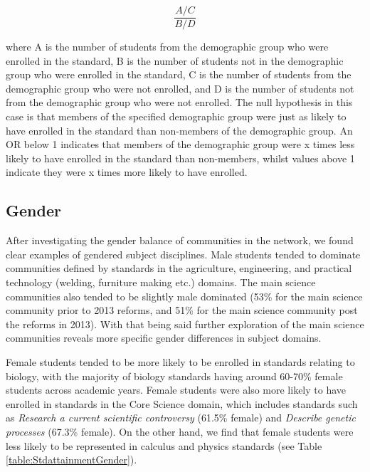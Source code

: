 \documentclass[a4paper]{article}
\begin{document}
    $$\frac{A/C}{B/D}$$

where A is the number of students from the demographic group who were enrolled in the standard, B is the number of students not in the demographic group who were enrolled in the standard, C is the number of students from the demographic group who were not enrolled, and D is the number of students not from the demographic group who were not enrolled. The null hypothesis in this case is that members of the specified demographic group were just as likely to have enrolled in the standard than non-members of the demographic group. An OR below 1 indicates that members of the demographic group were x times less likely to have enrolled in the standard than non-members, whilst values above 1 indicate they were x times more likely to have enrolled. 

\subsection*{Gender}
After investigating the gender balance of communities in the network, we found clear examples of gendered subject disciplines. Male students tended to dominate communities defined by standards in the agriculture, engineering, and practical technology (welding, furniture making etc.) domains. The main science communities also tended to be slightly male dominated (53\% for the main science community prior to 2013 reforms, and 51\% for the main science community post the reforms in 2013). With that being said further exploration of the main science communities reveals more specific gender differences in subject domains.

Female students tended to be more likely to be enrolled in standards relating to biology, with the majority of biology standards having around 60-70\% female students across academic years. Female students were also more likely to have enrolled in standards in the Core Science domain, which includes standards such as \textit{Research a current scientific controversy} (61.5\% female) and \textit{Describe genetic processes} (67.3\% female). On the other hand, we find that female students were less likely to be represented in calculus and physics standards (see Table \ref{table:StdattainmentGender}). 
\end{document}
